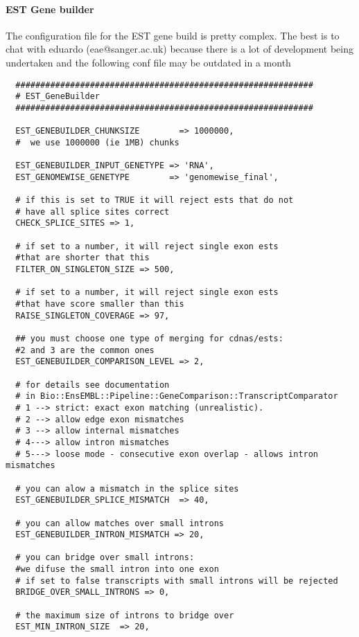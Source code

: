 \documentclass[a4paper,10pt]{article}
\begin{document}
\paragraph{EST Gene builder}
The configuration file for the EST gene build is pretty complex. The best is to chat with eduardo (eae@sanger.ac.uk) because there is a lot of development being undertaken and the following conf file may be outdated in a month 

\begin{verbatim}
  ############################################################
  # EST_GeneBuilder
  ############################################################
  
  EST_GENEBUILDER_CHUNKSIZE        => 1000000,      
  #  we use 1000000 (ie 1MB) chunks
  
  EST_GENEBUILDER_INPUT_GENETYPE => 'RNA',
  EST_GENOMEWISE_GENETYPE        => 'genomewise_final',
  
  # if this is set to TRUE it will reject ests that do not
  # have all splice sites correct
  CHECK_SPLICE_SITES => 1,
  
  # if set to a number, it will reject single exon ests 
  #that are shorter that this
  FILTER_ON_SINGLETON_SIZE => 500,
  
  # if set to a number, it will reject single exon ests 
  #that have score smaller than this
  RAISE_SINGLETON_COVERAGE => 97,
  
  ## you must choose one type of merging for cdnas/ests: 
  #2 and 3 are the common ones
  EST_GENEBUILDER_COMPARISON_LEVEL => 2,
  
  # for details see documentation 
  # in Bio::EnsEMBL::Pipeline::GeneComparison::TranscriptComparator
  # 1 --> strict: exact exon matching (unrealistic). 
  # 2 --> allow edge exon mismatches
  # 3 --> allow internal mismatches
  # 4---> allow intron mismatches
  # 5---> loose mode - consecutive exon overlap - allows intron mismatches
  
  # you can alow a mismatch in the splice sites
  EST_GENEBUILDER_SPLICE_MISMATCH  => 40,
  
  # you can allow matches over small introns 
  EST_GENEBUILDER_INTRON_MISMATCH => 20,
  
  # you can bridge over small introns: 
  #we difuse the small intron into one exon
  # if set to false transcripts with small introns will be rejected
  BRIDGE_OVER_SMALL_INTRONS => 0,
  
  # the maximum size of introns to bridge over
  EST_MIN_INTRON_SIZE  => 20,
  

\end{verbatim}
\end{document}
